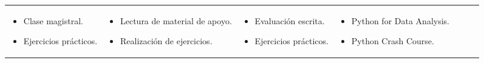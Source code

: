 \begin{landscape}
\begin{adjustbox}{width=1.3847\textwidth}
\begin{tabular}{ | p{1.5cm} | p{5cm} | p{5cm} | p{3cm} | p{3cm} | p{3cm} | p{4cm} | }
\begin{minipage}
\begin{itemize}
                    \item Clase magistral.
                    \item Ejercicios prácticos.
                \end{itemize}
                                                                               \end{minipage}          & \begin{minipage}
                                                                                                             [t]{3cm}
                                                                                                             \begin{itemize}
                    \item Lectura de material de apoyo.
                    \item Realización de ejercicios.
                \end{itemize}
                                                                                                         \end{minipage}      & \begin{minipage}
                                                                                                                                   [t]{3cm}
                                                                                                                                   \begin{itemize}
                    \item Evaluación escrita.
                    \item Ejercicios prácticos.
                \end{itemize}
                                                                                                                               \end{minipage}         & \begin{minipage}
                                                                                                                                                            [t]{4cm}
                                                                                                                                                            \begin{itemize}
                    \item Python for Data Analysis.
                    \item Python Crash Course.
                \end{itemize}
                                                                                                                                                        \end{minipage}
            \end{minipage}
            \hline
        \end{tabular}
    \end{adjustbox}
\end{landscape}
